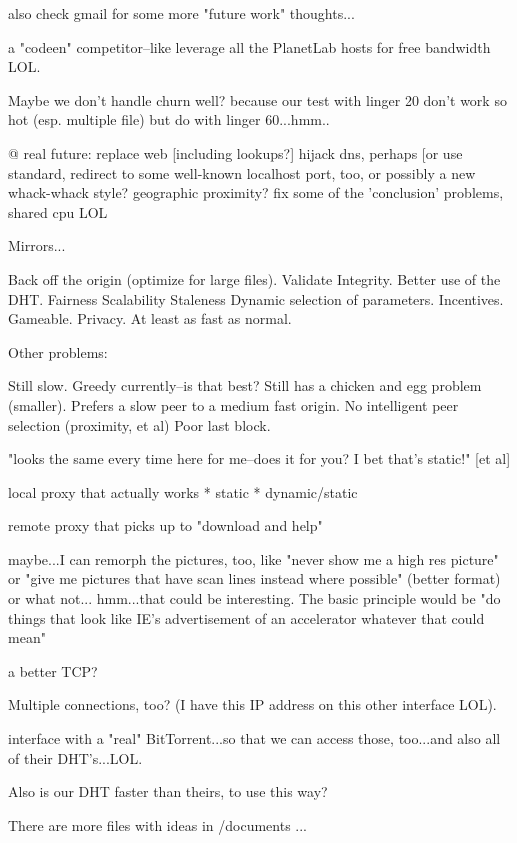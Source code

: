 also check gmail for some more "future work" thoughts...

a "codeen" competitor--like leverage all the PlanetLab hosts for free bandwidth LOL.

Maybe we don't handle churn well? because our test with linger 20 don't work so hot (esp. multiple file) but do with linger 60...hmm..

@ real future: replace web [including lookups?] hijack dns, perhaps [or use standard, redirect to some well-known localhost port, too, or possibly a new whack-whack style? geographic proximity? fix some of the 'conclusion' problems, shared cpu LOL

Mirrors...

Back off the origin (optimize for large files).
Validate Integrity.
Better use of the DHT.
Fairness
Scalability
Staleness
Dynamic selection of parameters.
Incentives.
Gameable.
Privacy.
At least as fast as normal.

Other problems:

Still slow.
Greedy currently--is that best?
Still has a chicken and egg problem (smaller).
Prefers a slow peer to a medium fast origin.
No intelligent peer selection (proximity, et al)
Poor last block.

"looks the same every time here for me--does it for you? I bet that's static!" [et al]

local proxy that actually works
 * static
 * dynamic/static
 
remote proxy that picks up to "download and help"

maybe...I can remorph the pictures, too, like "never show me a high res picture" or "give me pictures that have scan lines instead where possible" (better format) or what not... hmm...that could be interesting.
The basic principle would be "do things that look like IE's advertisement of an accelerator whatever that could mean"


a better TCP?

Multiple connections, too? (I have this IP address on this other interface LOL).

interface with a "real" BitTorrent...so that we can access those, too...and also all of their DHT's...LOL.

Also is our DHT faster than theirs, to use this way?

There are more files with ideas in /documents ...